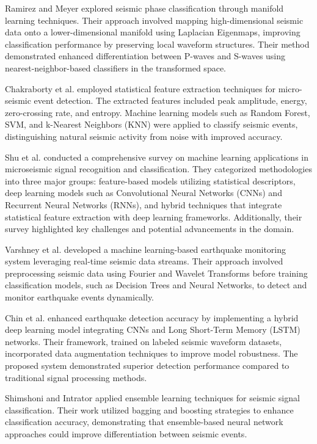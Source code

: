 \documentclass[conference]{IEEEtran}
\begin{document}
Ramirez and Meyer \cite{b2} explored seismic phase
classification through manifold learning techniques. Their approach involved
mapping high-dimensional seismic data onto a lower-dimensional manifold using
Laplacian Eigenmaps, improving classification performance by preserving local
waveform structures. Their method demonstrated enhanced differentiation between
P-waves and S-waves using nearest-neighbor-based classifiers in the transformed
space.


Chakraborty et al. \cite{b3} employed statistical feature extraction
techniques for micro-seismic event detection. The extracted features included
peak amplitude, energy, zero-crossing rate, and entropy. Machine learning models
such as Random Forest, SVM, and k-Nearest Neighbors (KNN) were applied to
classify seismic events, distinguishing natural seismic activity from noise with
improved accuracy.


Shu et al. \cite{b4} conducted a comprehensive survey on
machine learning applications in microseismic signal recognition and
classification. They categorized methodologies into three major groups:
feature-based models utilizing statistical descriptors, deep learning models
such as Convolutional Neural Networks (CNNs) and Recurrent Neural Networks
(RNNs), and hybrid techniques that integrate statistical feature extraction with
deep learning frameworks. Additionally, their survey highlighted key challenges
and potential advancements in the domain.


Varshney et al. \cite{b5} developed a
machine learning-based earthquake monitoring system leveraging real-time seismic
data streams. Their approach involved preprocessing seismic data using Fourier
and Wavelet Transforms before training classification models, such as Decision
Trees and Neural Networks, to detect and monitor earthquake events dynamically.


Chin et al. \cite{b6} enhanced earthquake detection accuracy by implementing a
hybrid deep learning model integrating CNNs and Long Short-Term Memory (LSTM)
networks. Their framework, trained on labeled seismic waveform datasets,
incorporated data augmentation techniques to improve model robustness. The
proposed system demonstrated superior detection performance compared to
traditional signal processing methods.


Shimshoni and Intrator \cite{b7} applied
ensemble learning techniques for seismic signal classification. Their work
utilized bagging and boosting strategies to enhance classification accuracy,
demonstrating that ensemble-based neural network approaches could improve
differentiation between seismic events.
\end{document}
